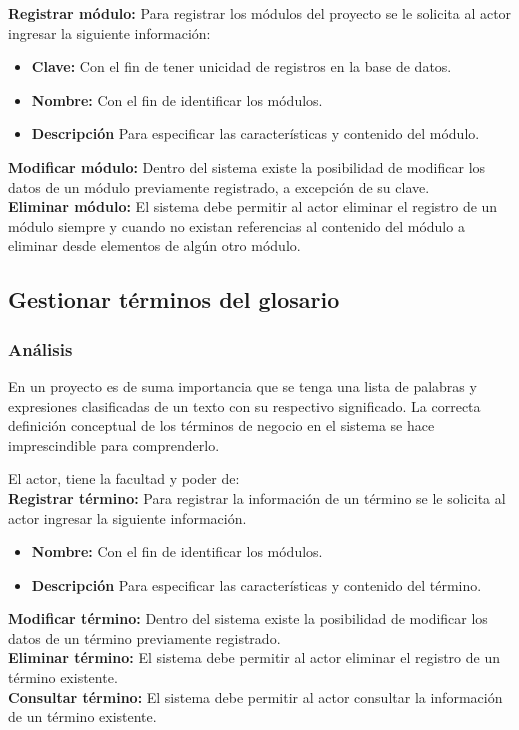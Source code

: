 \textbf {Registrar módulo:}
Para registrar los módulos del proyecto se le solicita al actor ingresar la siguiente información:

\begin{itemize}
	\item \textbf{Clave:} Con el fin de tener unicidad de registros en la base de datos.
	\item \textbf{Nombre:} Con el fin de identificar los módulos.
	\item \textbf{Descripción} Para especificar las características y contenido del módulo.
\end{itemize}

\textbf {Modificar módulo:}
Dentro del sistema existe la posibilidad de modificar los datos de un módulo previamente registrado, a excepción de su clave.\\

\textbf {Eliminar módulo:} 
El sistema debe permitir al actor eliminar el registro de un módulo siempre y cuando no existan referencias al contenido del módulo a eliminar desde elementos de algún otro módulo.


\subsection{Gestionar términos del glosario}
\subsubsection {Análisis}
En un proyecto es de suma importancia que se tenga una lista de palabras y expresiones clasificadas de un texto con su respectivo significado. La correcta definición conceptual de los términos de negocio en el sistema se hace imprescindible para comprenderlo.

El actor, tiene la facultad y poder de:\\

\textbf {Registrar término:}
Para registrar la información de un término se le solicita al actor ingresar la siguiente información.
\begin{itemize}
	\item \textbf{Nombre:} Con el fin de identificar los módulos.
	\item \textbf{Descripción} Para especificar las características y contenido del término.
\end{itemize}

\textbf {Modificar término:}
Dentro del sistema existe la posibilidad de modificar los datos de un término previamente registrado.\\

\textbf {Eliminar término:} 
El sistema debe permitir al actor eliminar el registro de un término existente.\\

\textbf {Consultar término:} 
El sistema debe permitir al actor consultar la información de un término existente.

